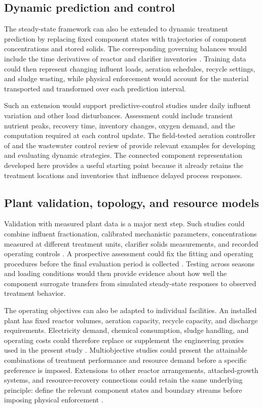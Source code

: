 \subsection{Dynamic prediction and control}

The steady-state framework can also be extended to dynamic treatment prediction by replacing fixed component states with trajectories of component concentrations and stored solids. The corresponding governing balances would include the time derivatives of reactor and clarifier inventories \citep{Takacs1991,Alex2008}. Training data could then represent changing influent loads, aeration schedules, recycle settings, and sludge wasting, while physical enforcement would account for the material transported and transformed over each prediction interval.

Such an extension would support predictive-control studies under daily influent variation and other load disturbances. Assessment could include transient nutrient peaks, recovery time, inventory changes, oxygen demand, and the computation required at each control update. The field-tested aeration controller of \citet{Bernardelli2020} and the wastewater control review of \citet{Croll2023} provide relevant examples for developing and evaluating dynamic strategies. The connected component representation developed here provides a useful starting point because it already retains the treatment locations and inventories that influence delayed process responses.

\subsection{Plant validation, topology, and resource models}

Validation with measured plant data is a major next step. Such studies could combine influent fractionation, calibrated mechanistic parameters, concentrations measured at different treatment units, clarifier solids measurements, and recorded operating controls \citep{Petersen2003,Machado2014,Newhart2019}. A prospective assessment could fix the fitting and operating procedures before the final evaluation period is collected \citep{Kaufman2012}. Testing across seasons and loading conditions would then provide evidence about how well the component surrogate transfers from simulated steady-state responses to observed treatment behavior.

The operating objectives can also be adapted to individual facilities. An installed plant has fixed reactor volumes, aeration capacity, recycle capacity, and discharge requirements. Electricity demand, chemical consumption, sludge handling, and operating costs could therefore replace or supplement the engineering proxies used in the present study \citep{Henze2008,Miederer2025}. Multiobjective studies could present the attainable combinations of treatment performance and resource demand before a specific preference is imposed. Extensions to other reactor arrangements, attached-growth systems, and resource-recovery connections could retain the same underlying principle: define the relevant component states and boundary streams before imposing physical enforcement \citep{Henze2008,Aboagye2021,Durkin2024}.

